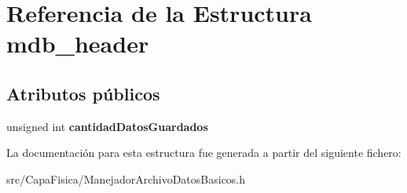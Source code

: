 \hypertarget{structmdb__header}{\section{\-Referencia de la \-Estructura mdb\-\_\-header}
\label{structmdb__header}
}
\subsection*{\-Atributos públicos}
\begin{DoxyCompactItemize}
\item 
\hypertarget{structmdb__header_a59ee15776e8a5dc8ccc0370f75eebf66}{unsigned int {\bfseries cantidad\-Datos\-Guardados}}\label{structmdb__header_a59ee15776e8a5dc8ccc0370f75eebf66}

\end{DoxyCompactItemize}


\-La documentación para esta estructura fue generada a partir del siguiente fichero\-:\begin{DoxyCompactItemize}
\item 
src/\-Capa\-Fisica/\-Manejador\-Archivo\-Datos\-Basicos.\-h\end{DoxyCompactItemize}
